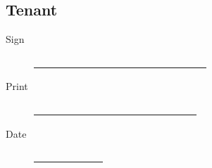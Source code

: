 \documentclass{amsart}
\begin{document}
\subsection*{Tenant}
\begin{description}
    \item[Sign]
        \underline{\ \ \ \ \ \ \ \ \ \ \ \ \ \ \ \ \ \ \ \ \ \ \ \ \ \ \ \ \ \ \ \ \ \ \ }
    \item[Print]
        \underline{\ \ \ \ \ \ \ \ \ \ \ \ \ \ \ \ \ \ \ \ \ \ \ \ \ \ \ \ \ \ \ \ \ }
    \item[Date]
        \underline{\ \ \ \ \ \ \ \ \ \ \ \ \ \ }
\end{description}
\end{document}
